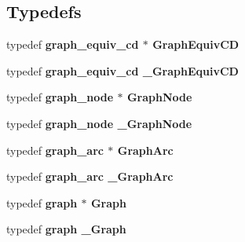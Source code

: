 \subsection*{Typedefs}
\begin{CompactItemize}
\item 
typedef \bf{graph\_\-equiv\_\-cd} $\ast$ \bf{Graph\-Equiv\-CD}
\item 
typedef \bf{graph\_\-equiv\_\-cd} \bf{\_\-Graph\-Equiv\-CD}
\item 
typedef \bf{graph\_\-node} $\ast$ \bf{Graph\-Node}
\item 
typedef \bf{graph\_\-node} \bf{\_\-Graph\-Node}
\item 
typedef \bf{graph\_\-arc} $\ast$ \bf{Graph\-Arc}
\item 
typedef \bf{graph\_\-arc} \bf{\_\-Graph\-Arc}
\item 
typedef \bf{graph} $\ast$ \bf{Graph}
\item 
typedef \bf{graph} \bf{\_\-Graph}
\end{CompactItemize}
